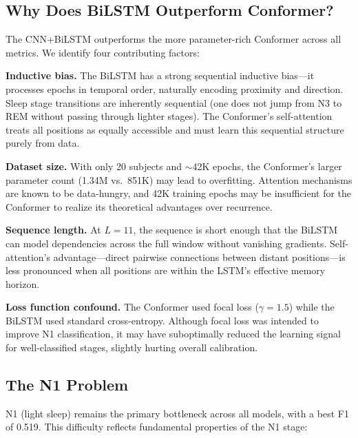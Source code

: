 \documentclass[final]{article}
\begin{document}
\subsection{Why Does BiLSTM Outperform Conformer?}

The CNN+BiLSTM outperforms the more parameter-rich Conformer across all metrics. We identify four contributing factors:

\textbf{Inductive bias.} The BiLSTM has a strong sequential inductive bias---it processes epochs in temporal order, naturally encoding proximity and direction. Sleep stage transitions are inherently sequential (one does not jump from N3 to REM without passing through lighter stages). The Conformer's self-attention treats all positions as equally accessible and must learn this sequential structure purely from data.

\textbf{Dataset size.} With only 20 subjects and $\sim$42K epochs, the Conformer's larger parameter count (1.34M vs.\ 851K) may lead to overfitting. Attention mechanisms are known to be data-hungry, and 42K training epochs may be insufficient for the Conformer to realize its theoretical advantages over recurrence.

\textbf{Sequence length.} At $L = 11$, the sequence is short enough that the BiLSTM can model dependencies across the full window without vanishing gradients. Self-attention's advantage---direct pairwise connections between distant positions---is less pronounced when all positions are within the LSTM's effective memory horizon.

\textbf{Loss function confound.} The Conformer used focal loss ($\gamma = 1.5$) while the BiLSTM used standard cross-entropy. Although focal loss was intended to improve N1 classification, it may have suboptimally reduced the learning signal for well-classified stages, slightly hurting overall calibration.

\subsection{The N1 Problem}

N1 (light sleep) remains the primary bottleneck across all models, with a best F1 of 0.519. This difficulty reflects fundamental properties of the N1 stage:
\end{document}
